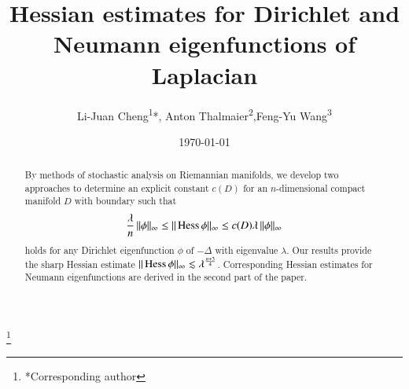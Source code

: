 \documentclass[11pt,reqno]{amsart}
\theoremstyle{definition} \newtheorem{remark}[theorem]{Remark}
\numberwithin{equation}{section}
\newcommand\1{\mathbbm{1}}
\begin{document}
 \title[Hessian estimate for eigenfunctions]
  {Hessian estimates for Dirichlet and Neumann eigenfunctions of Laplacian}


  \author{Li-Juan Cheng\textsuperscript{1}*, \quad Anton Thalmaier\textsuperscript{2},\quad Feng-Yu Wang\textsuperscript{3} }

  \address{\textsuperscript{1}School of  Mathematics, Hangzhou Normal University\\
    Hangzhou 311123, The People's Republic of China}
 \address{\textsuperscript{2} Department of Mathematics, University of
      Luxembourg, Maison du Nombre,\\
      L-4364 Esch-sur-Alzette, Luxembourg}
  \address{\textsuperscript{3} Center for Applied Mathematics, Tianjin
      University,\\
       Tianjin 300072, People's Republic of China}  
      
 
\thanks{*Corresponding author}





\begin{abstract}
  By methods of stochastic analysis on Riemannian manifolds, we develop
  two approaches to determine an explicit constant $c(D)$ for an
  $n$-dimensional compact manifold $D$ with boundary such that
  \begin{align*}
    \frac{\lambda}{n}\,\|\phi\|_{\infty} \leq \|\operatorname{Hess}\phi\|_\infty\leq c(D)\lambda \,\|\phi\|_{\infty}
  \end{align*}
  holds for any Dirichlet eigenfunction $\phi$ of $-\Delta$ with
  eigenvalue $\lambda$.  Our results provide the sharp Hessian estimate
$\|\Hess \phi\|_{\infty}\lesssim %
  \lambda^{\frac{n+3}{4}}$.
  Corresponding Hessian estimates for Neumann
  eigenfunctions are derived in the second part of the paper.
\end{abstract}

 
\date{\today}

\maketitle
\end{document}
